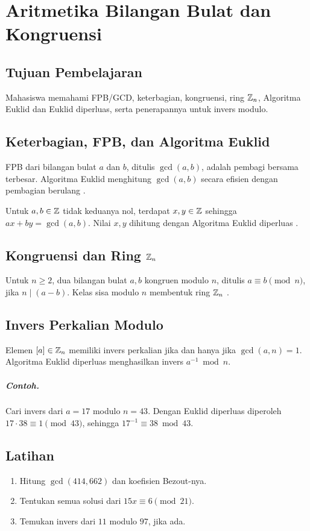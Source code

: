\documentclass[../main.tex]{subfiles}
\begin{document}
\chapter{Aritmetika Bilangan Bulat dan Kongruensi}

\section{Tujuan Pembelajaran}
Mahasiswa memahami FPB/GCD, keterbagian, kongruensi, ring \(\mathbb{Z}_n\), Algoritma Euklid dan Euklid diperluas, serta penerapannya untuk invers modulo.

\section{Keterbagian, FPB, dan Algoritma Euklid}
\begin{definition}
FPB dari bilangan bulat \(a\) dan \(b\), ditulis \(\gcd(a,b)\), adalah pembagi bersama terbesar. Algoritma Euklid menghitung \(\gcd(a,b)\) secara efisien dengan pembagian berulang \citep{rosen}.
\end{definition}

\begin{theorem}
Untuk \(a,b\in\mathbb{Z}\) tidak keduanya nol, terdapat \(x,y\in\mathbb{Z}\) sehingga \(ax+by=\gcd(a,b)\). Nilai \(x,y\) dihitung dengan Algoritma Euklid diperluas \citep{hoffstein}.
\end{theorem}

\section{Kongruensi dan Ring \(\mathbb{Z}_n\)}
\begin{definition}[Kongruensi]
Untuk \(n\ge 2\), dua bilangan bulat \(a,b\) kongruen modulo \(n\), ditulis \(a\equiv b \pmod n\), jika \(n\mid (a-b)\). Kelas sisa modulo \(n\) membentuk ring \(\mathbb{Z}_n\) \citep{hoffstein}.
\end{definition}

\section{Invers Perkalian Modulo}
Elemen \([a]\in\mathbb{Z}_n\) memiliki invers perkalian jika dan hanya jika \(\gcd(a,n)=1\). Algoritma Euklid diperluas menghasilkan invers \(a^{-1} \bmod n\).

\paragraph{Contoh.} Cari invers dari \(a=17\) modulo \(n=43\). Dengan Euklid diperluas diperoleh \(17\cdot 38 \equiv 1 \pmod{43}\), sehingga \(17^{-1}\equiv 38\bmod 43\).

\section{Latihan}
\begin{enumerate}
  \item Hitung \(\gcd(414, 662)\) dan koefisien Bezout-nya.
  \item Tentukan semua solusi dari \(15x\equiv 6 \pmod{21}\).
  \item Temukan invers dari \(11\) modulo \(97\), jika ada.
\end{enumerate}
\end{document}
